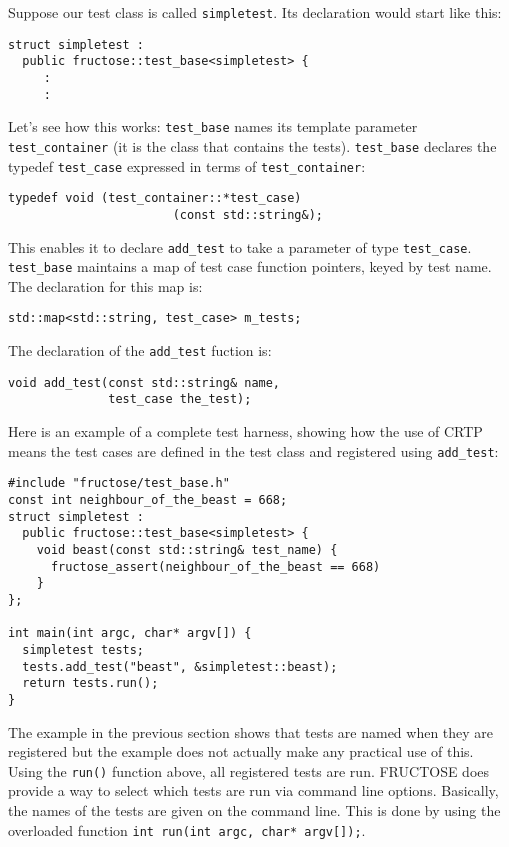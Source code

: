 \documentclass{book}
\begin{document}
Suppose our test class is called {\tt simpletest}.
Its declaration would start like this:
\begin{verbatim}
struct simpletest : 
  public fructose::test_base<simpletest> {
     :
     :
\end{verbatim}
Let's see how this works:
{\tt test\_base} names its template parameter 
{\tt test\_container} (it is the class that contains the tests). 
{\tt test\_base} declares the typedef 
{\tt test\_case} expressed in terms of {\tt test\_container}:
\begin{verbatim}
typedef void (test_container::*test_case)
                       (const std::string&);
\end{verbatim}
This enables it to declare {\tt add\_test} to take a parameter of
type {\tt test\_case}.
{\tt test\_base} maintains a map of test case function pointers, keyed
by test name. The declaration for this map is:
\begin{verbatim}
std::map<std::string, test_case> m_tests;
\end{verbatim}
The declaration of the {\tt add\_test} fuction is:
\begin{verbatim}
void add_test(const std::string& name, 
              test_case the_test);
\end{verbatim}
Here is an example of a complete test harness, showing how the use of
CRTP means the test cases are defined in the test class and
registered using {\tt add\_test}:

\begin{verbatim}
#include "fructose/test_base.h"
const int neighbour_of_the_beast = 668;
struct simpletest : 
  public fructose::test_base<simpletest> {
    void beast(const std::string& test_name) {
      fructose_assert(neighbour_of_the_beast == 668)
    }
};

int main(int argc, char* argv[]) {
  simpletest tests;
  tests.add_test("beast", &simpletest::beast);
  return tests.run();
}
\end{verbatim}


The example in the previous section shows that tests are named when they are
registered but the example does not actually make any practical use of this.
Using the {\tt run()} function above, all registered tests are run. FRUCTOSE
does provide a way to select which tests are run via command line options.
Basically, the names of the tests are given on the command line. This is done
by using the overloaded function {\tt int run(int argc, char* argv[]);}.
\end{document}
